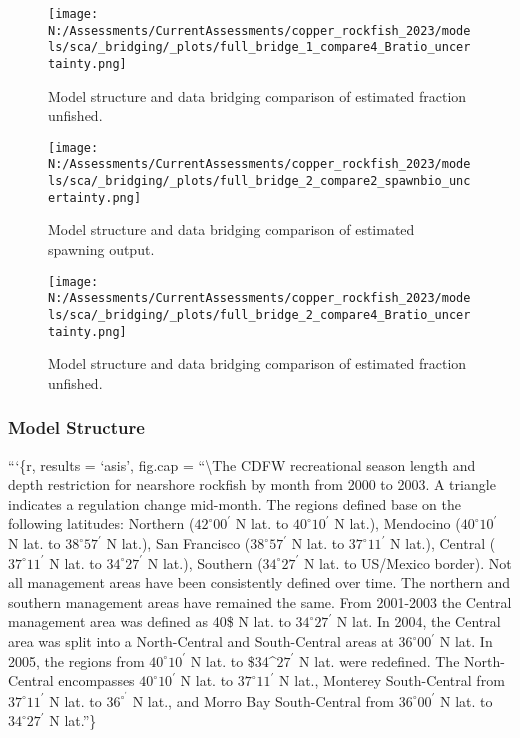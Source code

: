 \documentclass[11pt,
  english,
  letterpaper,
]{article}
\begin{document}
\begin{figure}
\centering
\texttt{[image: N:/Assessments/CurrentAssessments/copper\_rockfish\_2023/models/sca/\_bridging/\_plots/full\_bridge\_1\_compare4\_Bratio\_uncertainty.png]}
\caption{Model structure and data bridging comparison of estimated fraction unfished.\label{fig:data-bridge-depl-1}}
\end{figure}

\pagebreak

\begin{figure}
\centering
\texttt{[image: N:/Assessments/CurrentAssessments/copper\_rockfish\_2023/models/sca/\_bridging/\_plots/full\_bridge\_2\_compare2\_spawnbio\_uncertainty.png]}
\caption{Model structure and data bridging comparison of estimated spawning output.\label{fig:data-bridge-ssb-2}}
\end{figure}

\pagebreak

\begin{figure}
\centering
\texttt{[image: N:/Assessments/CurrentAssessments/copper\_rockfish\_2023/models/sca/\_bridging/\_plots/full\_bridge\_2\_compare4\_Bratio\_uncertainty.png]}
\caption{Model structure and data bridging comparison of estimated fraction unfished.\label{fig:data-bridge-depl-2}}
\end{figure}

\pagebreak

\hypertarget{model-structure}{%
\subsubsection{Model Structure}\label{model-structure}}

```\{r, results = `asis', fig.cap = ``\textbackslash The CDFW recreational season length and depth restriction for nearshore rockfish by month from 2000 to 2003. A triangle indicates a regulation change mid-month. The regions defined base on the following latitudes: Northern (\(42^\circ 00^\prime\) N lat. to \(40^\circ 10^\prime\) N lat.), Mendocino (\(40^\circ 10^\prime\) N lat. to \(38^\circ 57^\prime\) N lat.), San Francisco (\(38^\circ 57^\prime\) N lat. to \(37^\circ 11^\prime\) N lat.), Central (\(37^\circ 11^\prime\) N lat. to \(34^\circ 27^\prime\) N lat.), Southern (\(34^\circ 27^\prime\) N lat. to US/Mexico border). Not all management areas have been consistently defined over time. The northern and southern management areas have remained the same. From 2001-2003 the Central management area was defined as 40\textsuperscript{}\prime\$ N lat. to \(34^\circ 27^\prime\) N lat. In 2004, the Central area was split into a North-Central and South-Central areas at \(36^\circ 00^\prime\) N lat. In 2005, the regions from \(40^\circ 10^\prime\) N lat. to \$34\^{}\circ \(27^\prime\) N lat. were redefined. The North-Central encompasses \(40^\circ 10^\prime\) N lat. to \(37^\circ 11^\prime\) N lat., Monterey South-Central from \(37^\circ 11^\prime\) N lat. to \(36^\circ ^\prime\) N lat., and Morro Bay South-Central from \(36^\circ 00^\prime\) N lat. to \(34^\circ 27^\prime\) N lat.''\}
\end{document}
